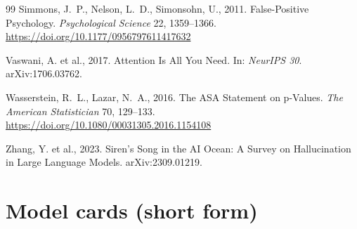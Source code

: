\documentclass[preprint,12pt,authoryear]{elsarticle}
\begin{document}
\begin{thebibliography}{99}
Simmons, J.~P., Nelson, L.~D., Simonsohn, U., 2011. False-Positive Psychology. \textit{Psychological Science} 22, 1359--1366. \url{https://doi.org/10.1177/0956797611417632}

Vaswani, A. et al., 2017. Attention Is All You Need. In: \textit{NeurIPS 30}. arXiv:1706.03762.

Wasserstein, R.~L., Lazar, N.~A., 2016. The ASA Statement on p-Values. \textit{The American Statistician} 70, 129--133. \url{https://doi.org/10.1080/00031305.2016.1154108}

Zhang, Y. et al., 2023. Siren's Song in the AI Ocean: A Survey on Hallucination in Large Language Models. arXiv:2309.01219.
\end{thebibliography}

\appendix

\section{Model cards (short form)}\label{app:models}

\begin{table}[htbp]
\centering
\footnotesize
\caption{Production LLM cards.}
\setlength{\tabcolsep}{3pt}
\end{table}
\end{document}
